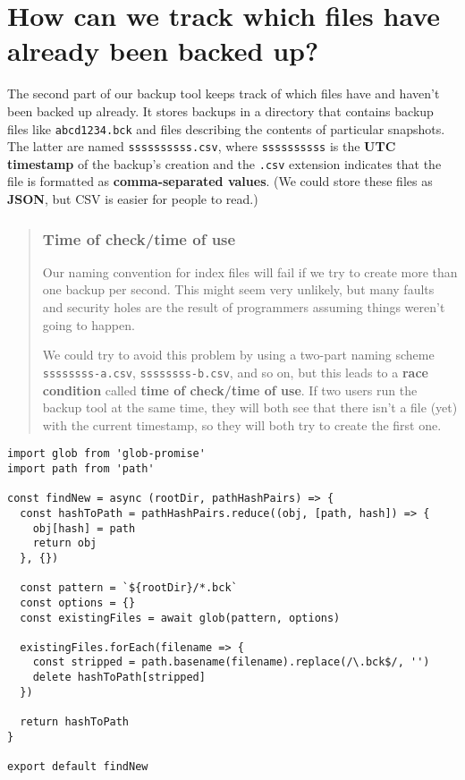 \documentclass[krantzl]{krantz}
\newcommand{\glossref}[1]{\textbf{#1}}
\newenvironment{callout}{\savenotes\begin{tBox}\begin{quotation}\toggletrue{inbox}\renewcommand{\thempfootnote}{\arabic{footnote}}}{\end{quotation}\vspace{\baselineskip}\end{tBox}\togglefalse{inbox}\spewnotes}
\begin{document}
\section{How can we track which files have already been backed up?}\label{file-backup-track}


The second part of our backup tool keeps track of which files have and haven't been backed up already.
It stores backups in a directory that contains backup files like \texttt{abcd1234.bck}
and files describing the contents of particular snapshots.
The latter are named \texttt{ssssssssss.csv},
where \texttt{ssssssssss} is the \glossref{UTC} \glossref{timestamp} of the backup's creation
and the \texttt{.csv} extension indicates that the file is formatted as \glossref{comma-separated values}.
(We could store these files as \glossref{JSON}, but CSV is easier for people to read.)

\begin{callout}


\subsubsection*{Time of check/time of use}


Our naming convention for index files will fail if we try to create more than one backup per second.
This might seem very unlikely,
but many faults and security holes are the result of programmers assuming things weren't going to happen.


We could try to avoid this problem by using a two-part naming scheme \texttt{ssssssss-a.csv},
\texttt{ssssssss-b.csv}, and so on,
but this leads to a \glossref{race condition}
called \glossref{time of check/time of use}.
If two users run the backup tool at the same time,
they will both see that there isn't a file (yet) with the current timestamp,
so they will both try to create the first one.

\end{callout}


\begin{lstlisting}[frame=single,frameround=tttt]
import glob from 'glob-promise'
import path from 'path'

const findNew = async (rootDir, pathHashPairs) => {
  const hashToPath = pathHashPairs.reduce((obj, [path, hash]) => {
    obj[hash] = path
    return obj
  }, {})

  const pattern = `${rootDir}/*.bck`
  const options = {}
  const existingFiles = await glob(pattern, options)

  existingFiles.forEach(filename => {
    const stripped = path.basename(filename).replace(/\.bck$/, '')
    delete hashToPath[stripped]
  })

  return hashToPath
}

export default findNew
\end{lstlisting}
\end{document}
